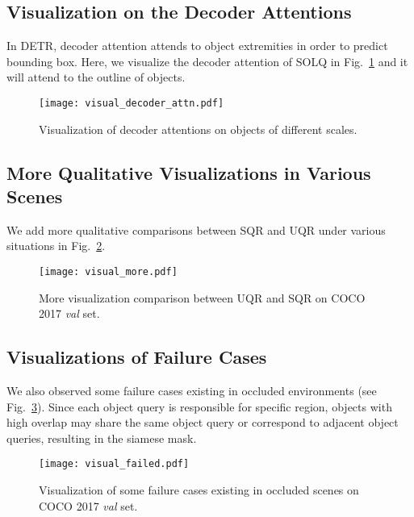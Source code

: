 \documentclass{article}
\begin{document}
\begin{table*}[h]
\caption{Comparisons on parameters, FLOPs and FPS between SQR and UQR. All models are evaluated on single Tesla V100 GPU with 512x852 input resolution.}
\vspace{-0.3cm}
\center
{}
\label{tab:efficiency}
\end{table*}

\subsection{Visualization on the Decoder Attentions}
\label{decoder_attention}
In DETR, decoder attention attends to object extremities in order to predict bounding box. Here, we visualize the decoder attention of SOLQ in Fig.~\ref{fig:visual_decoder_attn} and it will attend to the outline of objects. 

\begin{figure}[h]
\centering
\texttt{[image: visual\_decoder\_attn.pdf]}
\caption{Visualization of decoder attentions on objects of different scales.}
\label{fig:visual_decoder_attn}
\end{figure}

\subsection{More Qualitative Visualizations in Various Scenes}
\label{visual_more}
We add more qualitative comparisons between SQR and UQR under various situations in Fig.~\ref{fig:visual_more}. \vspace{-0.5cm}

\begin{figure}[h]
\centering
\texttt{[image: visual\_more.pdf]}
\caption{More visualization comparison between UQR and SQR on COCO 2017 \textit{val} set.}
\label{fig:visual_more}
\end{figure}

\subsection{Visualizations of Failure Cases}
\label{visual_failed}
We also observed some failure cases existing in occluded environments (see Fig.~\ref{fig:visual_failed}). Since each object query is responsible for specific region, objects with high overlap may share the same object query or correspond to adjacent object queries, resulting in the siamese mask.

\begin{figure}[th]
\centering
\texttt{[image: visual\_failed.pdf]}\vspace{-0.1cm}
\caption{Visualization of some failure cases existing in occluded scenes on COCO 2017 \textit{val} set.}
\label{fig:visual_failed}
\end{figure}
\end{document}
